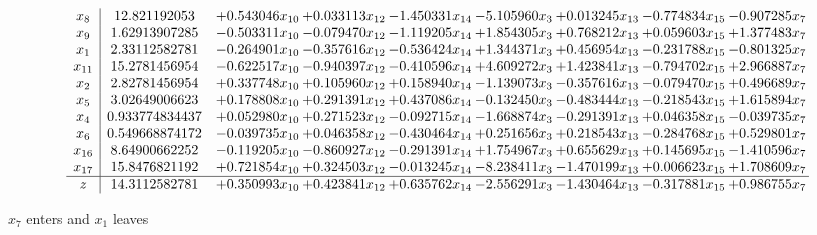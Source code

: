 \documentclass[10pt]{article}
\begin{document}
 \[\begin{array}{c| c c@{\hskip 2pt} c@{\hskip 2pt} c@{\hskip 2pt} c@{\hskip 2pt} c@{\hskip 2pt} c@{\hskip 2pt} c@{\hskip 2pt} }
 x_{8}   &  12.821192053 & + 0.543046 x_{10} & + 0.033113 x_{12} & -1.450331 x_{14} & -5.105960 x_{3} & + 0.013245 x_{13} & -0.774834 x_{15} & -0.907285 x_{7}\\
 x_{9}   &  1.62913907285 & -0.503311 x_{10} & -0.079470 x_{12} & -1.119205 x_{14} & + 1.854305 x_{3} & + 0.768212 x_{13} & + 0.059603 x_{15} & + 1.377483 x_{7}\\
 x_{1}   &  2.33112582781 & -0.264901 x_{10} & -0.357616 x_{12} & -0.536424 x_{14} & + 1.344371 x_{3} & + 0.456954 x_{13} & -0.231788 x_{15} & -0.801325 x_{7}\\
 x_{11}   &  15.2781456954 & -0.622517 x_{10} & -0.940397 x_{12} & -0.410596 x_{14} & + 4.609272 x_{3} & + 1.423841 x_{13} & -0.794702 x_{15} & + 2.966887 x_{7}\\
 x_{2}   &  2.82781456954 & + 0.337748 x_{10} & + 0.105960 x_{12} & + 0.158940 x_{14} & -1.139073 x_{3} & -0.357616 x_{13} & -0.079470 x_{15} & + 0.496689 x_{7}\\
 x_{5}   &  3.02649006623 & + 0.178808 x_{10} & + 0.291391 x_{12} & + 0.437086 x_{14} & -0.132450 x_{3} & -0.483444 x_{13} & -0.218543 x_{15} & + 1.615894 x_{7}\\
 x_{4}   &  0.933774834437 & + 0.052980 x_{10} & + 0.271523 x_{12} & -0.092715 x_{14} & -1.668874 x_{3} & -0.291391 x_{13} & + 0.046358 x_{15} & -0.039735 x_{7}\\
 x_{6}   &  0.549668874172 & -0.039735 x_{10} & + 0.046358 x_{12} & -0.430464 x_{14} & + 0.251656 x_{3} & + 0.218543 x_{13} & -0.284768 x_{15} & + 0.529801 x_{7}\\
 x_{16}   &  8.64900662252 & -0.119205 x_{10} & -0.860927 x_{12} & -0.291391 x_{14} & + 1.754967 x_{3} & + 0.655629 x_{13} & + 0.145695 x_{15} & -1.410596 x_{7}\\
 x_{17}   &  15.8476821192 & + 0.721854 x_{10} & + 0.324503 x_{12} & -0.013245 x_{14} & -8.238411 x_{3} & -1.470199 x_{13} & + 0.006623 x_{15} & + 1.708609 x_{7}\\
\hline
z    &  14.3112582781 & + 0.350993 x_{10} & + 0.423841 x_{12} & + 0.635762 x_{14} & -2.556291 x_{3} & -1.430464 x_{13} & -0.317881 x_{15} & + 0.986755 x_{7}\\
\end{array}\]


 $ x_{7} $ enters and $ x_{1} $ leaves 
\end{document}
